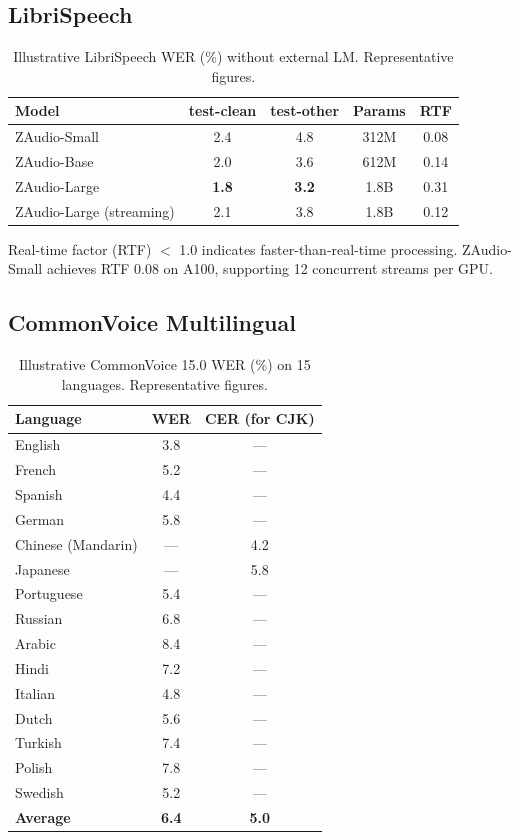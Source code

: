 \documentclass[11pt,a4paper]{article}
\begin{document}
\subsection{LibriSpeech}

\begin{table}[H]
\centering
\caption{Illustrative LibriSpeech WER (\%) without external LM. Representative figures.}
\label{tab:librispeech}
\begin{tabular}{lcccc}
\toprule
Model & test-clean & test-other & Params & RTF \\
\midrule
ZAudio-Small & 2.4 & 4.8 & 312M & 0.08 \\
ZAudio-Base & 2.0 & 3.6 & 612M & 0.14 \\
ZAudio-Large & \textbf{1.8} & \textbf{3.2} & 1.8B & 0.31 \\
ZAudio-Large (streaming) & 2.1 & 3.8 & 1.8B & 0.12 \\
\bottomrule
\end{tabular}
\end{table}

Real-time factor (RTF) $<$ 1.0 indicates faster-than-real-time processing. ZAudio-Small achieves RTF 0.08 on A100, supporting 12 concurrent streams per GPU.

\subsection{CommonVoice Multilingual}

\begin{table}[H]
\centering
\caption{Illustrative CommonVoice 15.0 WER (\%) on 15 languages. Representative figures.}
\label{tab:commonvoice}
\begin{tabular}{lcc}
\toprule
Language & WER & CER (for CJK) \\
\midrule
English & 3.8 & — \\
French & 5.2 & — \\
Spanish & 4.4 & — \\
German & 5.8 & — \\
Chinese (Mandarin) & — & 4.2 \\
Japanese & — & 5.8 \\
Portuguese & 5.4 & — \\
Russian & 6.8 & — \\
Arabic & 8.4 & — \\
Hindi & 7.2 & — \\
Italian & 4.8 & — \\
Dutch & 5.6 & — \\
Turkish & 7.4 & — \\
Polish & 7.8 & — \\
Swedish & 5.2 & — \\
\midrule
\textbf{Average} & \textbf{6.4} & \textbf{5.0} \\
\bottomrule
\end{tabular}
\end{table}
\end{document}
